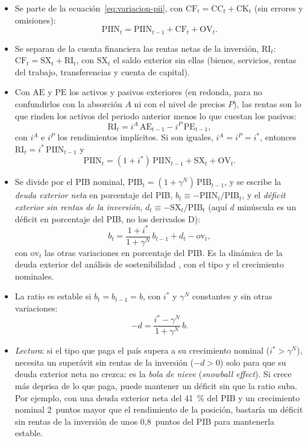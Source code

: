 \documentclass[11pt]{article}
\begin{document}
\begin{itemize}
\item Se parte de la ecuación~\eqref{eq:variacion-pii}, con $\mathrm{CF}_t=\mathrm{CC}_t+\mathrm{CK}_t$ (sin errores y omisiones):
\[
\mathrm{PIIN}_t=\mathrm{PIIN}_{t-1}+\mathrm{CF}_t+\mathrm{OV}_t .
\]
\item Se separan de la cuenta financiera las rentas netas de la inversión, $\mathrm{RI}_t$: $\mathrm{CF}_t=\mathrm{SX}_t+\mathrm{RI}_t$, con $\mathrm{SX}_t$ el saldo exterior sin ellas (bienes, servicios, rentas del trabajo, transferencias y cuenta de capital).
\item Con $\mathrm{AE}$ y $\mathrm{PE}$ los activos y pasivos exteriores (en redonda, para no confundirlos con la absorción $A$ ni con el nivel de precios $P$), las rentas son lo que rinden los activos del periodo anterior menos lo que cuestan los pasivos:
\[
\mathrm{RI}_t=i^{A}\,\mathrm{AE}_{t-1}-i^{P}\,\mathrm{PE}_{t-1},
\]
con $i^{A}$ e $i^{P}$ los rendimientos implícitos. Si son iguales, $i^{A}=i^{P}=i^*$, entonces $\mathrm{RI}_t=i^*\,\mathrm{PIIN}_{t-1}$ y
\[
\mathrm{PIIN}_t=(1+i^*)\,\mathrm{PIIN}_{t-1}+\mathrm{SX}_t+\mathrm{OV}_t .
\]
\item Se divide por el PIB nominal, $\mathrm{PIB}_t=(1+\gamma^N)\,\mathrm{PIB}_{t-1}$, y se escribe la \emph{deuda exterior neta} en porcentaje del PIB, $b_t\equiv-\mathrm{PIIN}_t/\mathrm{PIB}_t$, y el \emph{déficit exterior sin rentas de la inversión}, $d_t\equiv-\mathrm{SX}_t/\mathrm{PIB}_t$ (aquí $d$ minúscula es un déficit en porcentaje del PIB, no los derivados D):
\begin{equation}\label{eq:pii-deuda}
b_t=\frac{1+i^*}{1+\gamma^N}\,b_{t-1}+d_t-\mathrm{ov}_t ,
\end{equation}
con $\mathrm{ov}_t$ las otras variaciones en porcentaje del PIB. Es la dinámica de la deuda exterior del análisis de sostenibilidad , con el tipo y el crecimiento nominales.
\item La ratio es estable si $b_t=b_{t-1}=b$, con $i^*$ y $\gamma^N$ constantes y sin otras variaciones:
\begin{equation}\label{eq:saldo-estabilizador}
-d=\frac{i^*-\gamma^N}{1+\gamma^N}\,b .
\end{equation}
\findemo
\item \emph{Lectura}: si el tipo que paga el país supera a su crecimiento nominal ($i^*>\gamma^N$), necesita un superávit sin rentas de la inversión ($-d>0$) solo para que su deuda exterior neta no crezca: es la \emph{bola de nieve} (\emph{snowball effect}). Si crece más deprisa de lo que paga, puede mantener un déficit sin que la ratio suba. Por ejemplo, con una deuda exterior neta del 41~\% del PIB y un crecimiento nominal 2~puntos mayor que el rendimiento de la posición, bastaría un déficit sin rentas de la inversión de unos 0,8~puntos del PIB para mantenerla estable.

\end{itemize}
\end{document}
